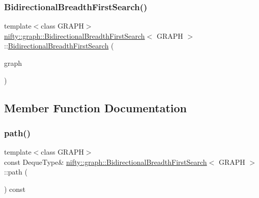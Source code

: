 \subsubsection{\texorpdfstring{Bidirectional\+Breadth\+First\+Search()}{BidirectionalBreadthFirstSearch()}}
{\footnotesize\ttfamily template$<$class G\+R\+A\+PH$>$ \\
\hyperlink{classnifty_1_1graph_1_1BidirectionalBreadthFirstSearch}{nifty\+::graph\+::\+Bidirectional\+Breadth\+First\+Search}$<$ G\+R\+A\+PH $>$\+::\hyperlink{classnifty_1_1graph_1_1BidirectionalBreadthFirstSearch}{Bidirectional\+Breadth\+First\+Search} (\begin{DoxyParamCaption}\item[{const \hyperlink{classnifty_1_1graph_1_1BidirectionalBreadthFirstSearch_a2a6e6ffd9c93b416a8bc1ad26dff97ac}{Graph\+Type} \&}]{graph }\end{DoxyParamCaption})\hspace{0.3cm}{\ttfamily [inline]}}



\subsection{Member Function Documentation}
\mbox{\label{classnifty_1_1graph_1_1BidirectionalBreadthFirstSearch_a8cb65a4e1ba03070fa77b4e8e8354332}} 
\subsubsection{\texorpdfstring{path()}{path()}}
{\footnotesize\ttfamily template$<$class G\+R\+A\+PH$>$ \\
const Deque\+Type\& \hyperlink{classnifty_1_1graph_1_1BidirectionalBreadthFirstSearch}{nifty\+::graph\+::\+Bidirectional\+Breadth\+First\+Search}$<$ G\+R\+A\+PH $>$\+::path (\begin{DoxyParamCaption}{ }\end{DoxyParamCaption}) const\hspace{0.3cm}{\ttfamily [inline]}}

\mbox{\label{classnifty_1_1graph_1_1BidirectionalBreadthFirstSearch_af6ae063fd07eb6635ebc070dac6d2730}} 
